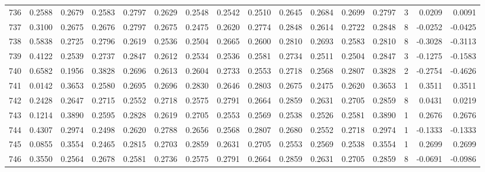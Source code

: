 \begin{tabular}{lrrrrrrrrrrrrrrr}
736 &      0.2588 &  0.2679 &  0.2583 &  0.2797 &  0.2629 &  0.2548 &  0.2542 &  0.2510 &  0.2645 &  0.2684 &   0.2699 &     0.2797 &      3 &                    0.0209 &                     0.0091 \\
737 &      0.3100 &  0.2675 &  0.2676 &  0.2797 &  0.2675 &  0.2475 &  0.2620 &  0.2774 &  0.2848 &  0.2614 &   0.2722 &     0.2848 &      8 &                   -0.0252 &                    -0.0425 \\
738 &      0.5838 &  0.2725 &  0.2796 &  0.2619 &  0.2536 &  0.2504 &  0.2665 &  0.2600 &  0.2810 &  0.2693 &   0.2583 &     0.2810 &      8 &                   -0.3028 &                    -0.3113 \\
739 &      0.4122 &  0.2539 &  0.2737 &  0.2847 &  0.2612 &  0.2534 &  0.2536 &  0.2581 &  0.2734 &  0.2511 &   0.2504 &     0.2847 &      3 &                   -0.1275 &                    -0.1583 \\
740 &      0.6582 &  0.1956 &  0.3828 &  0.2696 &  0.2613 &  0.2604 &  0.2733 &  0.2553 &  0.2718 &  0.2568 &   0.2807 &     0.3828 &      2 &                   -0.2754 &                    -0.4626 \\
741 &      0.0142 &  0.3653 &  0.2580 &  0.2695 &  0.2696 &  0.2830 &  0.2646 &  0.2803 &  0.2675 &  0.2475 &   0.2620 &     0.3653 &      1 &                    0.3511 &                     0.3511 \\
742 &      0.2428 &  0.2647 &  0.2715 &  0.2552 &  0.2718 &  0.2575 &  0.2791 &  0.2664 &  0.2859 &  0.2631 &   0.2705 &     0.2859 &      8 &                    0.0431 &                     0.0219 \\
743 &      0.1214 &  0.3890 &  0.2595 &  0.2828 &  0.2619 &  0.2705 &  0.2553 &  0.2569 &  0.2538 &  0.2526 &   0.2581 &     0.3890 &      1 &                    0.2676 &                     0.2676 \\
744 &      0.4307 &  0.2974 &  0.2498 &  0.2620 &  0.2788 &  0.2656 &  0.2568 &  0.2807 &  0.2680 &  0.2552 &   0.2718 &     0.2974 &      1 &                   -0.1333 &                    -0.1333 \\
745 &      0.0855 &  0.3554 &  0.2465 &  0.2815 &  0.2703 &  0.2859 &  0.2631 &  0.2705 &  0.2553 &  0.2569 &   0.2538 &     0.3554 &      1 &                    0.2699 &                     0.2699 \\
746 &      0.3550 &  0.2564 &  0.2678 &  0.2581 &  0.2736 &  0.2575 &  0.2791 &  0.2664 &  0.2859 &  0.2631 &   0.2705 &     0.2859 &      8 &                   -0.0691 &                    -0.0986 \\

\end{tabular}
